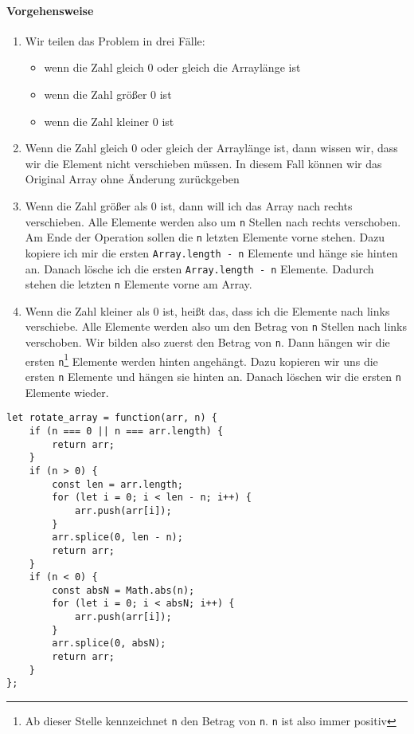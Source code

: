 \documentclass{book}
\begin{document}
\paragraph{Vorgehensweise}
\begin{enumerate} 
	\item Wir teilen das Problem in drei Fälle: 
	\begin{itemize} 
		\item wenn die Zahl gleich 0 oder gleich die Arraylänge ist
		\item wenn die Zahl größer 0 ist 
		\item wenn die Zahl kleiner 0 ist
	\end{itemize}

	\item Wenn die Zahl gleich 0 oder gleich der Arraylänge ist, dann wissen wir, dass wir die Element nicht verschieben müssen. In diesem Fall können wir das Original Array ohne Änderung zurückgeben

	\item Wenn die Zahl größer als 0 ist, dann will ich das Array nach rechts verschieben. Alle Elemente werden also um \lstinline|n| Stellen nach rechts verschoben. Am Ende der Operation sollen die \lstinline|n| letzten Elemente vorne stehen. Dazu kopiere ich mir die ersten \lstinline|Array.length - n| Elemente und hänge sie hinten an. Danach lösche ich die ersten \lstinline|Array.length - n| Elemente. Dadurch stehen die letzten \lstinline|n| Elemente vorne am Array.
	
	\item Wenn die Zahl kleiner als 0 ist, heißt das, dass ich die Elemente nach links verschiebe. Alle Elemente werden also um den Betrag von \lstinline|n| Stellen nach links verschoben. Wir bilden also zuerst den Betrag von \lstinline|n|. Dann hängen wir die ersten \lstinline|n|\footnote{Ab dieser Stelle kennzeichnet \lstinline|n| den Betrag von \lstinline|n|. \lstinline|n| ist also immer positiv} Elemente werden hinten angehängt. Dazu kopieren wir uns die ersten \lstinline|n| Elemente und hängen sie hinten an. Danach löschen wir die ersten \lstinline|n| Elemente wieder.
\end{enumerate}

\begin{lstlisting}[caption=My Javascript Example]
let rotate_array = function(arr, n) {
	if (n === 0 || n === arr.length) {
		return arr;
	}
	if (n > 0) {
		const len = arr.length;
		for (let i = 0; i < len - n; i++) {
			arr.push(arr[i]);
		}
		arr.splice(0, len - n);
		return arr;    
	}
	if (n < 0) {
		const absN = Math.abs(n);
		for (let i = 0; i < absN; i++) {
			arr.push(arr[i]);
		}
		arr.splice(0, absN);
		return arr;
	}
};
\end{lstlisting}
\end{document}

